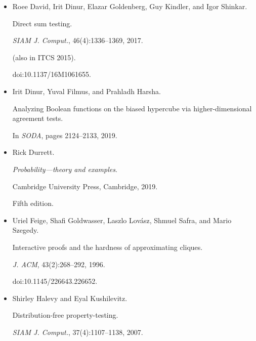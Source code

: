 \begin{itemize}
(also in STOC 1990).


doi:10.1016/0022-0000(93)90044-W.





\item[] 
[16]

Roee David, Irit Dinur, Elazar Goldenberg, Guy Kindler, and Igor Shinkar.


Direct sum testing.


\emph{SIAM J. Comput.}, 46(4):1336–1369, 2017.


(also in ITCS 2015).


doi:10.1137/16M1061655.





\item[] 
[17]

Irit Dinur, Yuval Filmus, and Prahladh Harsha.


Analyzing Boolean functions on the biased hypercube via
higher-dimensional agreement tests.


In \emph{SODA}, pages 2124–2133, 2019.





\item[] 
[18]

Rick Durrett.


\emph{Probability—theory and examples}.


Cambridge University Press, Cambridge, 2019.


Fifth edition.





\item[] 
[19]

Uriel Feige, Shafi Goldwasser, Laszlo Lovász, Shmuel Safra, and Mario
Szegedy.


Interactive proofs and the hardness of approximating cliques.


\emph{J. ACM}, 43(2):268–292, 1996.


doi:10.1145/226643.226652.





\item[] 
[20]

Shirley Halevy and Eyal Kushilevitz.


Distribution-free property-testing.


\emph{SIAM J. Comput.}, 37(4):1107–1138, 2007.



\end{itemize}
